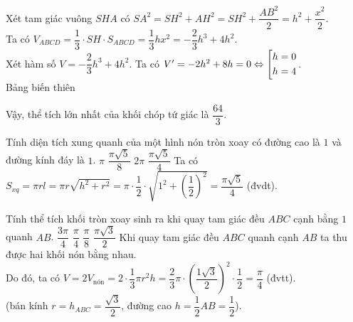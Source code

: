 \begin{ex}
{			Xét tam giác vuông $SHA$ có $SA^2 = SH^2 + AH^2 = SH^2 + \dfrac{AB^2}{2} = h^2 + \dfrac{x^2}{2}$.\\
			Ta có $V_{ABCD} = \dfrac{1}{3} \cdot SH \cdot S_{ABCD} = \dfrac{1}{3} hx^2 = -\dfrac{2}{3} h^3 + 4h^2$.\\
			Xét hàm số $V = -\dfrac{2}{3} h^3 + 4h^2$. Ta có $V' = -2h^2 + 8h= 0 \Leftrightarrow \left[\begin{aligned}&h = 0 \\ &h=4\end{aligned}\right. $.\\
			Bảng biến thiên
			\begin{center}
			\end{center}
		Vậy, thể tích lớn nhất của khối chóp tứ giác là $\dfrac{64}{3}$.
		}
	
	
	
\end{ex}

\begin{ex}%
	Tính diện tích xung quanh của một hình nón tròn xoay có đường cao là $1$ và đường kính đáy là $1$.
	\choice
		{$\pi $}
		{$\dfrac{\pi \sqrt{5}}{8}$}
		{$2\pi $}
		{\True $\dfrac{\pi \sqrt{5}}{4}$}
	\loigiai
		{
			Ta có $S_{xq}=\pi rl=\pi r\sqrt{h^2+r^2}=\pi \cdot \dfrac{1}{2}\cdot \sqrt{1^2+{\left(\dfrac{1}{2}\right)}^2}=\dfrac{\pi \sqrt{5}}{4}$ (đvdt).
		}
\end{ex}

\begin{ex}%
	Tính thể tích khối tròn xoay sinh ra khi quay tam giác đều $ABC$ cạnh bằng $1$ quanh $AB$.
	\choice
		{$\dfrac{3\pi}{4}$}
		{\True $\dfrac{\pi}{4}$}
		{$\dfrac{\pi}{8}$}
		{$\dfrac{\pi \sqrt{3}}{2}$}
	\loigiai
		{
			Khi quay tam giác đều $ABC$ quanh cạnh $AB$ ta thu được hai khối nón bằng nhau. \\
			Do đó, ta có $V=2V_\text{nón}=2\cdot \dfrac{1}{3}\pi r^2h=\dfrac{2}{3}\pi \cdot {\left(\dfrac{1\sqrt{3}}{2}\right)}^2\cdot \dfrac{1}{2}=\dfrac{\pi}{4}$ (đvtt). \\
			(bán kính $r=h_{ABC}=\dfrac{\sqrt{3}}{2}$, đường cao $h=\dfrac{1}{2}AB=\dfrac{1}{2}$).
		}
\end{ex}

